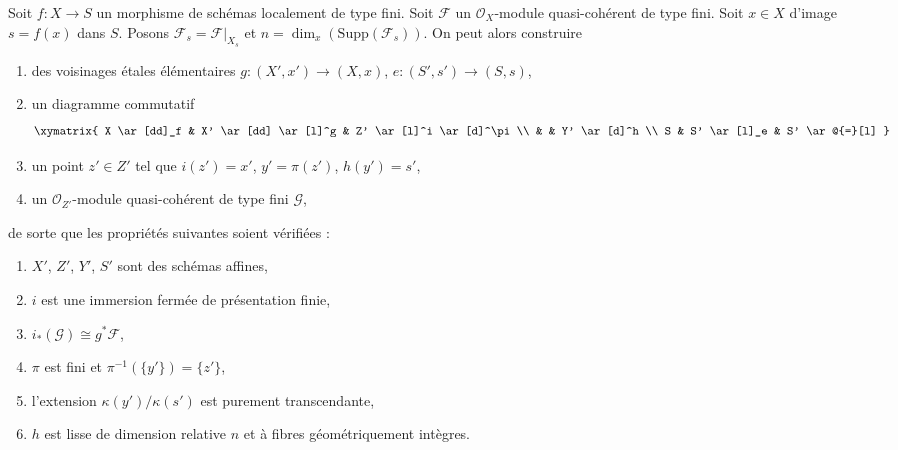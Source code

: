 \begin{lemma}
\label{lemma-elementary-devissage}
Soit $f : X \to S$ un morphisme de schémas localement de type fini.
Soit $\mathcal{F}$ un $\mathcal{O}_X$-module quasi-cohérent de type fini.
Soit $x \in X$ d'image $s = f(x)$ dans $S$.
Posons $\mathcal{F}_s = \mathcal{F}|_{X_s}$ et
$n = \dim_x(\text{Supp}(\mathcal{F}_s))$.
On peut alors construire
\begin{enumerate}
\item des voisinages \'etales élémentaires $g : (X', x') \to (X, x)$,
$e : (S', s') \to (S, s)$,
\item un diagramme commutatif
$$
\xymatrix{
X \ar[dd]_f & X' \ar[dd] \ar[l]^g & Z' \ar[l]^i \ar[d]^\pi \\
& & Y' \ar[d]^h \\
S & S' \ar[l]_e & S' \ar@{=}[l]
}
$$
\item un point $z' \in Z'$ tel que $i(z') = x'$, $y' = \pi(z')$, $h(y') = s'$,
\item un $\mathcal{O}_{Z'}$-module quasi-cohérent de type fini $\mathcal{G}$,
\end{enumerate}
de sorte que les propriétés suivantes soient vérifiées :
\begin{enumerate}
\item $X'$, $Z'$, $Y'$, $S'$ sont des schémas affines,
\item $i$ est une immersion fermée de présentation finie,
\item $i_*(\mathcal{G}) \cong g^*\mathcal{F}$,
\item $\pi$ est fini et $\pi^{-1}(\{y'\}) = \{z'\}$,
\item l'extension $\kappa(y')/\kappa(s')$ est purement transcendante,
\item $h$ est lisse de dimension relative $n$
et à fibres géométriquement intègres.
\end{enumerate}
\end{lemma}

